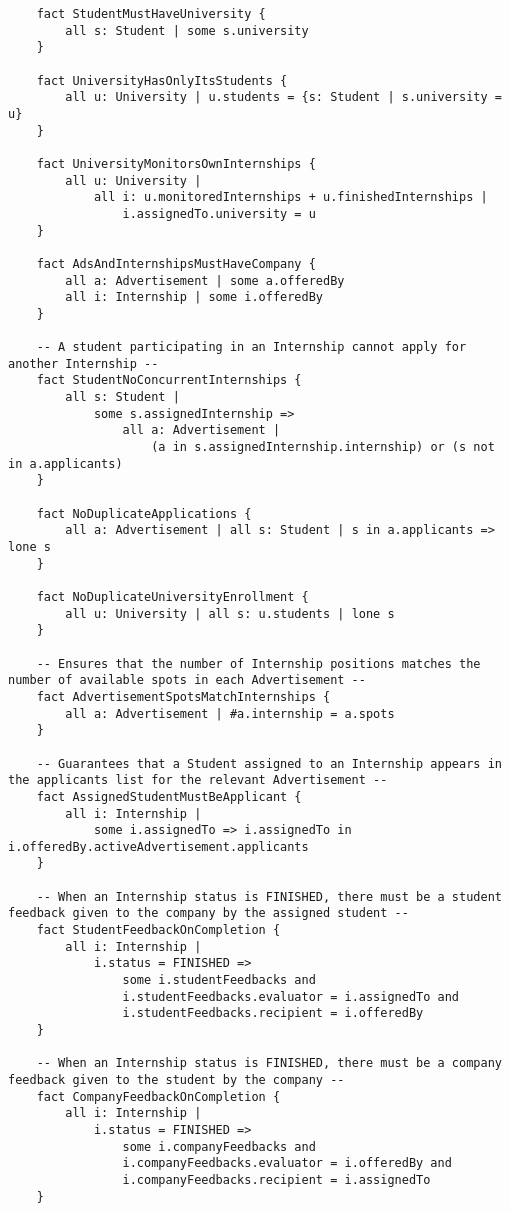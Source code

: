 \begin{lstlisting}
    fact StudentMustHaveUniversity {
        all s: Student | some s.university
    }
    
    fact UniversityHasOnlyItsStudents {
        all u: University | u.students = {s: Student | s.university = u}
    }
    
    fact UniversityMonitorsOwnInternships {
        all u: University |
            all i: u.monitoredInternships + u.finishedInternships |
                i.assignedTo.university = u
    }
    
    fact AdsAndInternshipsMustHaveCompany {
        all a: Advertisement | some a.offeredBy
        all i: Internship | some i.offeredBy
    }
    
    -- A student participating in an Internship cannot apply for another Internship --
    fact StudentNoConcurrentInternships {
        all s: Student |
            some s.assignedInternship =>
                all a: Advertisement | 
                    (a in s.assignedInternship.internship) or (s not in a.applicants)
    }
    
    fact NoDuplicateApplications {
        all a: Advertisement | all s: Student | s in a.applicants => lone s
    }
    
    fact NoDuplicateUniversityEnrollment {
        all u: University | all s: u.students | lone s
    }
    
    -- Ensures that the number of Internship positions matches the number of available spots in each Advertisement --
    fact AdvertisementSpotsMatchInternships {
        all a: Advertisement | #a.internship = a.spots
    }
    
    -- Guarantees that a Student assigned to an Internship appears in the applicants list for the relevant Advertisement --
    fact AssignedStudentMustBeApplicant {
        all i: Internship | 
            some i.assignedTo => i.assignedTo in i.offeredBy.activeAdvertisement.applicants
    }
    
    -- When an Internship status is FINISHED, there must be a student feedback given to the company by the assigned student --
    fact StudentFeedbackOnCompletion {
        all i: Internship | 
            i.status = FINISHED =>
                some i.studentFeedbacks and
                i.studentFeedbacks.evaluator = i.assignedTo and
                i.studentFeedbacks.recipient = i.offeredBy
    }
    
    -- When an Internship status is FINISHED, there must be a company feedback given to the student by the company --
    fact CompanyFeedbackOnCompletion {
        all i: Internship | 
            i.status = FINISHED =>
                some i.companyFeedbacks and
                i.companyFeedbacks.evaluator = i.offeredBy and
                i.companyFeedbacks.recipient = i.assignedTo
    }
    

\end{lstlisting}
